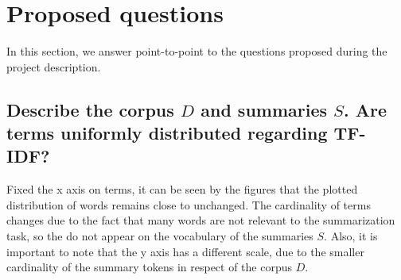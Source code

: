 \section{Proposed questions}
In this section, we answer point-to-point to the questions proposed during the project description.

\subsection{Describe the corpus $D$ and summaries $S$. Are terms uniformly distributed regarding TF-IDF?}
Fixed the x axis on terms, it can be seen by the figures that the plotted
distribution of words remains close to unchanged. The cardinality of terms changes due to the fact that many words are not relevant to the summarization task, so the do not appear on the vocabulary of the summaries $S$. Also, it is important to
note that the y axis has a different scale, due to the smaller cardinality of the summary tokens in respect of the corpus $D$.
